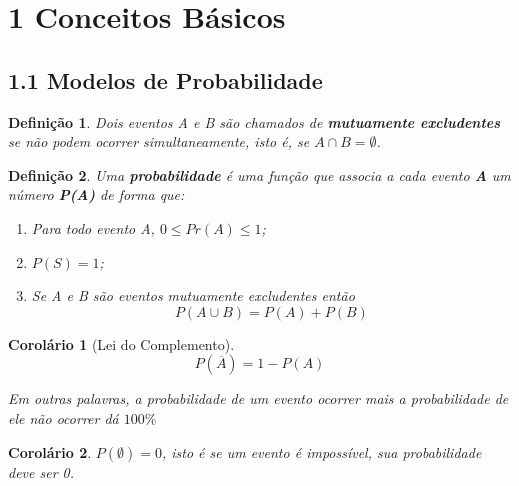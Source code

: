 \documentclass[12pt]{article}
\newtheorem{corollary}{Corolário}[theorem]
\newtheorem{definition}{Definição}
\begin{document}
\textbf{}
\vspace{3mm}

\textbf{}
\vspace{3mm}

\textbf{}
\vspace{3mm}

\textbf{}
\vspace{3mm}

\textbf{}

\newpage

\section*{1 Conceitos Básicos}
\label{s1}

\subsection*{1.1 Modelos de Probabilidade}
\label{s2}

\begin{definition}
Dois eventos A e B são chamados de \textbf{mutuamente excludentes} se não podem ocorrer simultaneamente, isto é, se $A \cap B = \emptyset$.
\end{definition}

\begin{definition}
Uma \textbf{probabilidade} é uma função que associa a cada evento \textbf{A} um número \textbf{P(A)} de forma que:
\begin{enumerate}
    \item Para todo evento A, $0 \leqslant Pr(A) \leqslant 1$;
    \item $P(S) = 1$;
    \item Se A e B são eventos mutuamente excludentes então
    $$P(A \cup B) = P(A) + P(B)$$
\end{enumerate}
\end{definition}

\begin{corollary}[Lei do Complemento]
$$P(\overline{A}) = 1 - P(A)$$

Em outras palavras, a probabilidade de um evento ocorrer mais a probabilidade de ele não ocorrer dá $100\%$
\end{corollary}

\begin{corollary}
$P(\emptyset) = 0$, isto é se um evento é impossível, sua probabilidade deve ser 0.
\end{corollary}
\end{document}
